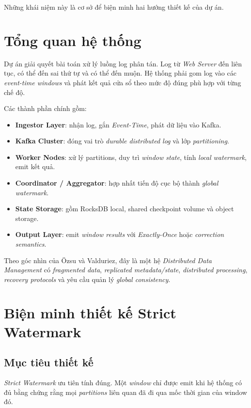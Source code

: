 \documentclass[12pt,a4paper]{article}
\begin{document}
Những khái niệm này là cơ sở để biện minh hai hướng thiết kế của dự án.

\section{Tổng quan hệ thống}

Dự án giải quyết bài toán xử lý luồng log phân tán. Log từ \textit{Web Server} đến liên tục, có thể đến sai thứ tự và có thể đến muộn. Hệ thống phải gom log vào các \textit{event-time windows} và phát kết quả cửa sổ theo mức độ đúng phù hợp với từng chế độ.

Các thành phần chính gồm:

\begin{itemize}
    \item \textbf{Ingestor Layer}: nhận log, gắn \textit{Event-Time}, phát dữ liệu vào Kafka.
    \item \textbf{Kafka Cluster}: đóng vai trò \textit{durable distributed log} và lớp \textit{partitioning}.
    \item \textbf{Worker Nodes}: xử lý partitions, duy trì \textit{window state}, tính \textit{local watermark}, emit kết quả.
    \item \textbf{Coordinator / Aggregator}: hợp nhất tiến độ cục bộ thành \textit{global watermark}.
    \item \textbf{State Storage}: gồm RocksDB local, shared checkpoint volume và object storage.
    \item \textbf{Output Layer}: emit \textit{window results} với \textit{Exactly-Once} hoặc \textit{correction semantics}.
\end{itemize}

Theo góc nhìn của Özsu và Valduriez, đây là một hệ \textit{Distributed Data Management} có \textit{fragmented data}, \textit{replicated metadata/state}, \textit{distributed processing}, \textit{recovery protocols} và yêu cầu quản lý \textit{global consistency}.

\section{Biện minh thiết kế Strict Watermark}

\subsection{Mục tiêu thiết kế}

\textit{Strict Watermark} ưu tiên tính đúng. Một \textit{window} chỉ được emit khi hệ thống có đủ bằng chứng rằng mọi \textit{partitions} liên quan đã đi qua mốc thời gian của window đó.
\end{document}
